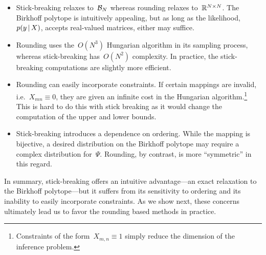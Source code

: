 \documentclass[twoside]{article}
\begin{document}
\begin{itemize}
\item Stick-breaking relaxes to~$\mathcal{B}_N$ whereas rounding relaxes
  to~$\mathbb{R}^{N \times N}$. The Birkhoff polytope is
  intuitively appealing, but as long as the likelihood,~$p(y \, | \, X)$,
  accepts real-valued matrices, either may suffice. 
  
\item Rounding uses the~$O(N^3)$ Hungarian algorithm in its sampling
  process, whereas stick-breaking has~$O(N^2)$ complexity. In practice,
  the stick-breaking computations are slightly more efficient.
    
\item Rounding can easily incorporate constraints.  If certain
  mappings are invalid, i.e.~${X_{mn} \equiv 0}$, they are given an
  infinite cost in the Hungarian algorithm.\footnote{Constraints of
    the form~$X_{m,n} \equiv 1$ simply reduce the dimension of the
    inference problem.}  This is hard to do this with stick breaking
  as it would change the computation of the upper and lower bounds. 
  
\item Stick-breaking introduces a dependence on ordering.  While the
  mapping is bijective, a desired distribution on the Birkhoff polytope
  may require a complex distribution for~$\Psi$.  Rounding, by contrast,
  is more ``symmetric'' in this regard.
  
\end{itemize}

In summary, stick-breaking offers an intuitive advantage---an exact
relaxation to the Birkhoff polytope---but it suffers from its
sensitivity to ordering and its inability to easily incorporate
constraints.  As we show next, these concerns ultimately lead us to
favor the rounding based methods in practice.

\end{document}
